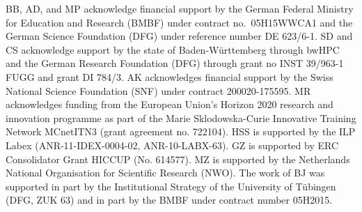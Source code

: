 \documentclass[twocolumn,epjc3]{svjour3} %
\begin{document}
BB, AD, and MP acknowledge financial support by the
German Federal Ministry for Education and Research (BMBF) under
contract no.~05H15WWCA1 and the German Science Foundation (DFG) under
reference number DE 623/6-1.
SD and CS acknowledge support by the state of Baden-W\"urttemberg through bwHPC and the German Research Foundation (DFG) through grant no INST 39/963-1 FUGG and grant DI 784/3.
AK acknowledges financial support by the Swiss National Science Foundation (SNF) under contract 200020-175595.
MR acknowledges funding from the European Union's Horizon 2020 research and innovation programme as part of the Marie Sklodowska-Curie Innovative Training Network MCnetITN3 (grant agreement no. 722104).
HSS is supported by the ILP Labex (ANR-11-IDEX-0004-02, ANR-10-LABX-63).
GZ is supported by ERC Consolidator Grant HICCUP (No. 614577).
MZ is supported by the Netherlands National Organisation for Scientific Research (NWO). The work of BJ was supported in part by the Institutional Strategy of the University of T\"ubingen (DFG, ZUK 63) and in part by
the BMBF under contract number 05H2015.



\end{document}
